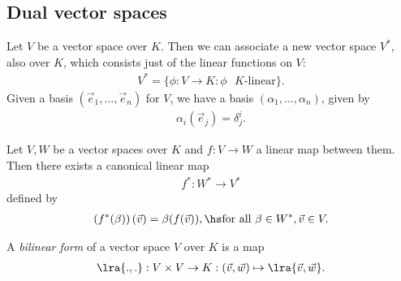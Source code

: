 \documentclass{article}
\begin{document}
\subsection{Dual vector spaces}

\begin{definition}
    Let $V$ be a vector space over $K$. Then we can associate a new vector space $V^*$,
    also over $K$, which consists just of the linear functions on $V$:
    \begin{align*}
        V^* = \{\phi : V\to K : \phi \text{ $K$-linear}\}.
    \end{align*}
    Given a basis $(\vec e_1,..., \vec e_n)$ for $V$, we have a basis $(\alpha_1, ..., \alpha_n)$,
    given by 
    \begin{align*}
        \alpha_i(\vec e_j) = \delta_j^i.
    \end{align*}
\end{definition}

\begin{definition}
    Let $V,W$ be a vector spaces over $K$ and $f:V\to W$ a linear map between them.
    Then there exists a canonical linear map 
    \begin{align*}
        f^*:W^*\to V^*
    \end{align*}
    defined by
    \begin{align*}
        \left(f^*(\beta)\right)(\vec v) = \beta(f(\vec v)), \hs\text{for all } \beta\in W^*,\vec v\in V.
    \end{align*}
\end{definition}

\begin{definition}
    A \emph{bilinear form} of a vector space $V$ over $K$ is a map
    \begin{align*}
        \lra{.,.} : V\times V \to K : (\vec v, \vec w) \mapsto \lra{\vec v, \vec w}.
    \end{align*}
\end{definition}
\end{document}
